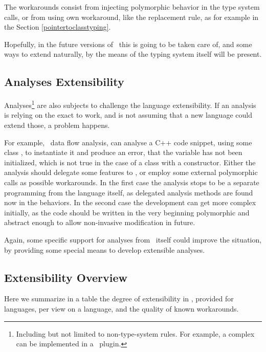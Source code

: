 The workarounds consist from injecting polymorphic behavior in the type system calls, or from using \jbmps own workaround, like 
the replacement rule, as for example in the Section \ref{pointertoclasstyping}.

Hopefully, in the future versions of \jbmps\ this is going to be taken care of, and some ways to extend naturally, by the 
means of the typing system itself will be present.

\subsection{Analyses Extensibility}
\label{analysesext}

Analyses\footnote{Including but not limited to non-type-system rules. For example, a complex  can be implemented in a \jbmps\ plugin.} are also subjects to challenge the language extensibility. If an analysis is relying on the exact 
to work, and is not assuming that a new language could extend those, a problem happens.

For example, \mbdr\ data flow analysis, can analyse a C++ code snippet, using some class , to instantiate it 
and produce an error, that the variable  has not been initialized, which is not true in the case of a class with a constructor.
Either the analysis should delegate some features to , or employ some external polymorphic calls as possible workarounds.
In the first case the analysis stops to be a separate programming from the language itself, as delegated analysis methods are found now
in the  behaviors. In the second case the development can get more complex initially, as the code should be written 
in the very beginning polymorphic and abstract enough to allow non-invasive modification in future.


Again, some specific support for analyses from \jbmps\ itself could improve the situation, by providing some special means 
to develop extensible analyses.


\subsection{Extensibility Overview}

Here we summarize in a table the degree of extensibility in \jbmps, provided for languages, per view on a language,
and the quality of known workarounds.

